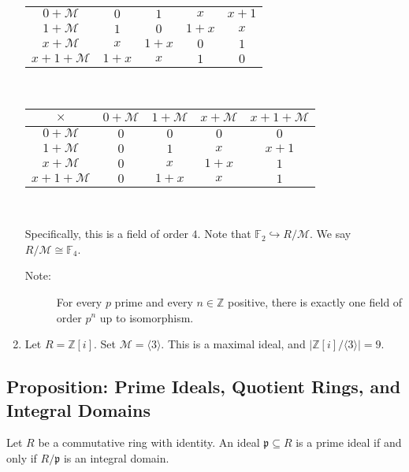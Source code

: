 \documentclass[8pt]{extarticle}
\newcommand{\Z}{\mathbb{Z}}
\begin{document}
\begin{enumerate}[(1)]
\begin{center}
\begin{tabular}{c|cccc}
          \hline
          $0 + \mathcal{M}$ & $0$ & $1$ & $x$ & $x+1$\\
          $1 + \mathcal{M}$ & $1$ & $0$ & $1+x$ & $x$\\
          $x + \mathcal{M}$ & $x$ & $1+x$ & $0$ & $1$\\
          $x+1 + \mathcal{M}$ & $1+x$ & $x$ & $1$ & $0$
        \end{tabular}\\
        \begin{tabular}{c|cccc}
          $\times$ & $0 + \mathcal{M}$ & $1 + \mathcal{M}$ & $x + \mathcal{M}$ & $x+1 + \mathcal{M}$\\
          \hline
          $0 + \mathcal{M}$ & $0$ & $0$ & $0$ & $0$\\
          $1 + \mathcal{M}$ & $0$ & $1$ & $x$ & $x+1$\\
          $x + \mathcal{M}$ & $0$ & $x$ & $1+x$ & $1$\\
          $x+1 + \mathcal{M}$ & $0$ & $1+x$ & $x$ & $1$
        \end{tabular}\\
      \end{center}
      Specifically, this is a field of order $4$. Note that $\mathbb{F}_2 \hookrightarrow R/\mathcal{M}$. We say $R/\mathcal{M} \cong \mathbb{F}_4$. 
      \begin{description}
        \item[Note:] For every $p$ prime and every $n\in \Z$ positive, there is exactly one field of order $p^n$ up to isomorphism.
      \end{description}
    \item Let $R = \Z[i]$. Set $\mathcal{M} = \langle 3\rangle$. This is a maximal ideal, and $|\Z[i]/\langle 3 \rangle| = 9$.
  \end{enumerate}
  \subsection{Proposition: Prime Ideals, Quotient Rings, and Integral Domains}%
  Let $R$ be a commutative ring with identity. An ideal $\mathfrak{p}\subseteq R$ is a prime ideal if and only if $R/\mathfrak{p}$ is an integral domain.\\
\end{document}

